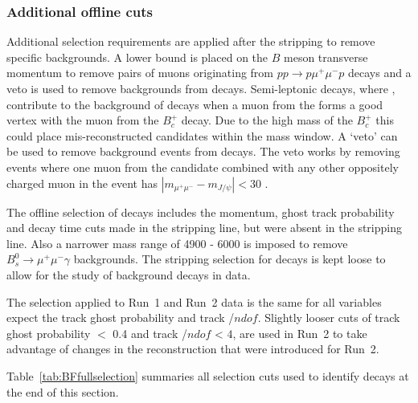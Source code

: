 \subsubsection{Additional offline cuts}
\label{finalloosesel}

Additional selection requirements are applied after the stripping to remove specific backgrounds. A lower bound is placed on the $B$ meson transverse momentum to remove pairs of muons originating from $pp \to p\mu^{+}\mu^{-} p$ decays and a \jpsi veto is used to remove backgrounds from \bcjpsimunu decays. Semi-leptonic \bcjpsimunu decays, where \jpsimumu, contribute to the background of \bmumu decays when a muon from the \jpsi forms a good vertex with the muon from the $B_{c}^{+}$ decay. Due to the high mass of the $B_{c}^{+}$ this could place mis-reconstructed candidates within the \bs mass window. A `\jpsi veto' can be used to remove background events from \bcjpsimunu decays. The veto works by removing events where one muon from the \bmumu candidate combined with any other oppositely charged muon in the event has $|m_{\mu^{+}\mu^{-}} - m_{J/\psi}| < 30$  \mevcc. %

The offline selection of \bmumu decays includes the momentum, ghost track probability and decay time cuts made in the \bhh stripping line, but were absent in the \bmumu stripping line. Also a narrower mass range of 4900 - 6000 \mevcc is imposed to remove $B_{s}^{0} \to \mu^{+} \mu^{-} \gamma$ backgrounds. The stripping selection for \bmumu decays is kept loose to allow for the study of background decays in data. 

The selection applied to Run~1 and Run~2 data is the same for all variables expect the track ghost probability and track \chisqd/$ndof$. Slightly looser cuts of track ghost probability $<$ 0.4 and track \chisqd/$ndof$ < $4$, are used in Run~2 to take advantage of changes in the reconstruction that were introduced for Run~2. 

Table~\ref{tab:BFfullselection} summaries all selection cuts used to identify \bmumu %
decays at the end of this section.

